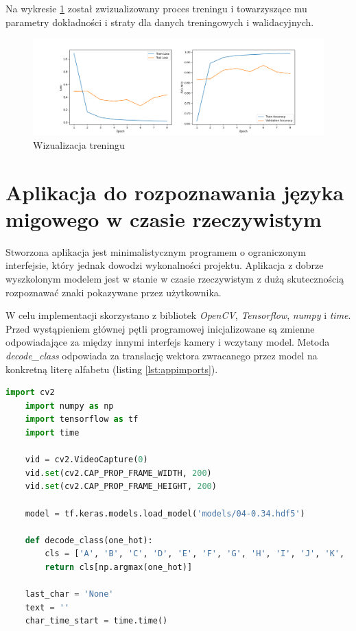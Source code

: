 \documentclass[a4paper,12pt,oneside]{book} %
\begin{document}
Na wykresie \ref{model_train} został zwizualizowany proces treningu i towarzyszące mu parametry dokładności i straty dla danych treningowych i walidacyjnych.

\begin{figure}[h]
	\centering
	\includegraphics[scale=0.31]{train.png}
	\caption{Wizualizacja treningu}
	\label{model_train}
\end{figure}

\section{Aplikacja do rozpoznawania języka migowego w czasie rzeczywistym}

Stworzona aplikacja jest minimalistycznym programem o ograniczonym interfejsie, który jednak dowodzi wykonalności projektu. Aplikacja z dobrze wyszkolonym modelem jest w stanie w czasie rzeczywistym z dużą skutecznością rozpoznawać znaki pokazywane przez użytkownika.

W celu implementacji skorzystano z bibliotek \emph{OpenCV}, \emph{Tensorflow}, \emph{numpy} i \emph{time}. Przed wystąpieniem głównej pętli programowej inicjalizowane są zmienne odpowiadające za między innymi interfejs kamery i wczytany model. Metoda \emph{decode\_class} odpowiada za translację wektora zwracanego przez model na konkretną literę alfabetu (listing \ref{lst:appimports}).

\begin{lstlisting}[language=Python, caption={Wykorzystywane biblioteki i inicjalizacja zmiennych}, label={lst:appimports}]
	import cv2
	import numpy as np
	import tensorflow as tf
	import time
	
	vid = cv2.VideoCapture(0)
	vid.set(cv2.CAP_PROP_FRAME_WIDTH, 200)
	vid.set(cv2.CAP_PROP_FRAME_HEIGHT, 200)

	model = tf.keras.models.load_model('models/04-0.34.hdf5')
	
	def decode_class(one_hot):
		cls = ['A', 'B', 'C', 'D', 'E', 'F', 'G', 'H', 'I', 'J', 'K', 'L', 'M', 'N', 'O', 'P', 'Q', 'R', 'S', 'T', 'U', 'V', 'W', 'X', 'Y', 'Z']
		return cls[np.argmax(one_hot)]
	
	last_char = 'None'
	text = ''
	char_time_start = time.time()
\end{lstlisting}
\end{document}
